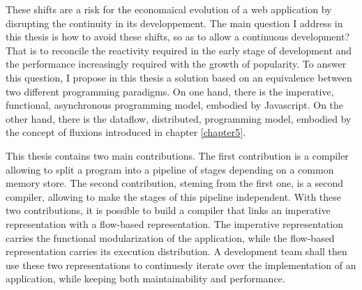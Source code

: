 These shifts are a risk for the economaical evolution of a web application by disrupting the continuity in its developpement.
The main question I address in this thesis is how to avoid these shifts, so as to allow a continuous development?
That is to reconcile the reactivity required in the early stage of development and the performance increasingly required with the growth of popularity.
To answer this question, I propose in this thesis a solution based on an equivalence between two different programming paradigms.
On one hand, there is the imperative, functional, asynchronous programming model, embodied by Javascript.
On the other hand, there is the dataflow, distributed, programming model, embodied by the concept of fluxions introduced in chapter \ref{chapter5}.

This thesis contains two main contributions.
The first contribution is a compiler allowing to split a program into a pipeline of stages depending on a common memory store.
The second contribution, steming from the first one, is a second compiler, allowing to make the stages of this pipeline independent.
With these two contributions, it is possible to build a compiler that links an imperative representation with a flow-based representation.
The imperative representation carries the functional modularization of the application, while the flow-based representation carries its execution distribution.
A development team shall then use these two representations to continuesly iterate over the implementation of an application, while keeping both maintainability and performance.



